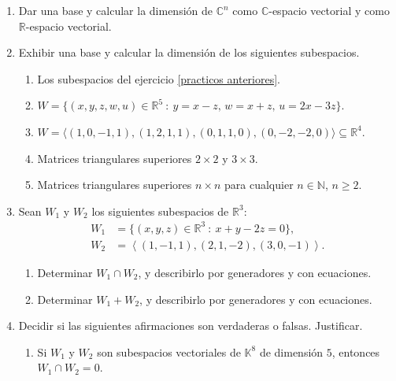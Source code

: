 \begin{enumerate}[resume, topsep=6pt, itemsep=.4cm]
\item Dar una base y calcular la dimensión de $\mathbb{C}^n$ como $\mathbb{C}$-espacio vectorial y como $\mathbb{R}$-espacio vectorial.


\item  Exhibir una base y calcular la dimensión de los siguientes subespacios.

 \begin{enumerate}
    \item Los subespacios del ejercicio \ref{practicos anteriores}.
    \item $W = \{(x,y,z,w,u) \in \mathbb{R}^5 \ : \ y = x - z,\, w = x + z,\,  u = 2x - 3z \}$.
    \item $W = \langle (1, 0, -1, 1),  (1, 2, 1, 1), (0, 1, 1, 0), (0, -2, -2, 0) \rangle \subseteq \mathbb R^4$.
    \item Matrices triangulares superiores $2\times 2$ y $3\times 3$.
    \item Matrices triangulares superiores $n\times n$ para cualquier $n\in\mathbb{N}$, $n\geq 2$.
\end{enumerate}

\item Sean $W_1$ y $W_2$ los siguientes subespacios de $\mathbb{R}^3$:
    \begin{align*}
    W_1 &= \{ (x,y,z)\in\mathbb{R}^3\ : \ x+y-2z=0\},  \\
    W_2 &= {\left\langle(1,-1,1),(2,1,-2),(3,0,-1)\right\rangle}.
    \end{align*}
    \begin{enumerate}
        \item  Determinar $W_1 \cap W_2$, y describirlo por generadores y con ecuaciones.
        \item  Determinar $W_1+W_2$, y describirlo por generadores y con ecuaciones.
    \end{enumerate}


\item\label{verdadero o falso} Decidir si las siguientes afirmaciones son verdaderas o falsas. Justificar.

\begin{enumerate}
 \item Si $W_1$ y $W_2$ son subespacios vectoriales de $\mathbb{K}^8$ de dimensión $5$, entonces $W_1\cap W_2=0$.


\end{enumerate}
\end{enumerate}
